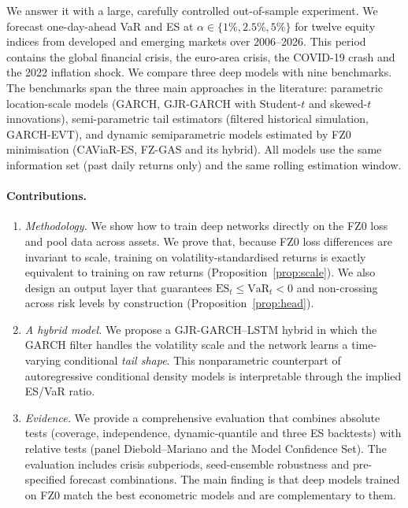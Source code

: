 \documentclass[11pt]{article}
\theoremstyle{remark}
\newcommand{\1}{\mathbf{1}}
\newcommand{\VaR}{\mathrm{VaR}}
\newcommand{\ES}{\mathrm{ES}}
\begin{document}
We answer it with a large, carefully controlled out-of-sample experiment. We forecast one-day-ahead VaR and ES at $\alpha\in\{1\%,2.5\%,5\%\}$ for twelve equity indices from developed and emerging markets over 2006--2026. This period contains the global financial crisis, the euro-area crisis, the COVID-19 crash and the 2022 inflation shock. We compare three deep models with nine benchmarks. The benchmarks span the three main approaches in the literature: parametric location-scale models (GARCH, GJR-GARCH with Student-$t$ and skewed-$t$ innovations), semi-parametric tail estimators (filtered historical simulation, GARCH-EVT), and dynamic semiparametric models estimated by FZ0 minimisation (CAViaR-ES, FZ-GAS and its hybrid). All models use the same information set (past daily returns only) and the same rolling estimation window.

\paragraph{Contributions.}
\begin{enumerate}
\item \emph{Methodology.} We show how to train deep networks directly on the FZ0 loss and pool data across assets. We prove that, because FZ0 loss differences are invariant to scale, training on volatility-standardised returns is exactly equivalent to training on raw returns (Proposition~\ref{prop:scale}). We also design an output layer that guarantees $\ES_t\le\VaR_t<0$ and non-crossing across risk levels by construction (Proposition~\ref{prop:head}).
\item \emph{A hybrid model.} We propose a GJR-GARCH--LSTM hybrid in which the GARCH filter handles the volatility scale and the network learns a time-varying conditional \emph{tail shape}. This nonparametric counterpart of autoregressive conditional density models \citep{hansen1994autoregressive} is interpretable through the implied ES/VaR ratio.
\item \emph{Evidence.} We provide a comprehensive evaluation that combines absolute tests (coverage, independence, dynamic-quantile and three ES backtests) with relative tests (panel Diebold--Mariano and the Model Confidence Set). The evaluation includes crisis subperiods, seed-ensemble robustness and pre-specified forecast combinations. The main finding is that deep models trained on FZ0 match the best econometric models and are complementary to them.
\end{enumerate}
\end{document}
